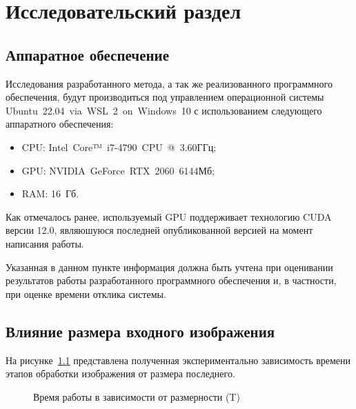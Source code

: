 \chapter{Исследовательский раздел}

\section{Аппаратное обеспечение}

Исследования разработанного метода, а так же реализованного программного обеспечения, будут производиться под управлением операционной системы Ubuntu~22.04~via~WSL~2~on~Windows~10 с использованием следующего аппаратного обеспечения:
\begin{itemize}[label=---]
    \item CPU: Intel~Core™~i7-4790~CPU~@~3.60ГГц;
    \item GPU: NVIDIA~GeForce~RTX~2060~6144Мб;
    \item RAM: 16~Гб.
\end{itemize}

Как отмечалось ранее, используемый GPU поддерживает технологию CUDA версии 12.0, являюшуюся последней опубликованной версией на момент написания работы.

Указанная в данном пункте информация должна быть учтена при оценивании результатов работы разработанного программного обеспечения и, в частности, при оценке времени отклика системы.

\section{Влияние размера входного изображения}

На рисунке~\ref{plt:steps-timing} представлена полученная экспериментально зависимость времени этапов обработки изображения от размера последнего.

\begin{figure}[htp]
	\centering
	\captionsetup{justification=centering}
	\caption{Время работы в зависимости от размерности (T)}
	\label{plt:steps-timing}
\end{figure}

